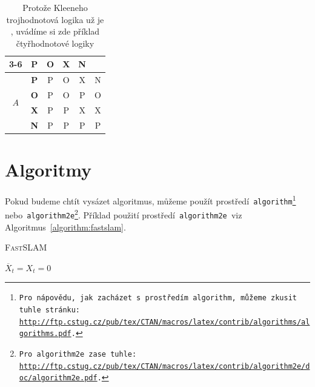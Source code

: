 \documentclass[a4paper, 11pt]{article}
\begin{document}
\begin{table}[h]
\begin{center}
\begin{tabular}{| c | c | c | c | c | c |}
            \\ \cline{3-6}
            \multicolumn{2}{| c |}{} & \textbf{P}   & \textbf{O} & \textbf{X}	& \textbf{N} \\ \hline
			\multirow{4}{*}{$A$}	& \textbf{P}    & P & O & X & N \\ \cline{2-6}
									& \textbf{O}    & P & O & P & O \\ \cline{2-6}
									& \textbf{X}    & P & P & X & X \\ \cline{2-6}
									& \textbf{N}    & P & P & P & P \\ \hline
		\end{tabular}
        \caption{Protože Kleeneho trojhodnotová logika už je , uvádíme si zde příklad čtyřhodnotové
        logiky}
        \label{table:logika}        
    \end{center}
\end{table}
\pagebreak

\section{Algoritmy}
\label{section:algoritmy}
Pokud budeme chtít vysázet algoritmus, můžeme použít prostředí\texttt{ algorithm\footnote{Pro nápovědu, jak zacházet s~prostředím\texttt{ algorithm,} můžeme zkusit tuhle stránku:\\
    \href{http://ftp.cstug.cz/pub/tex/CTAN/macros/latex/contrib/algorithms/algorithms.pdf}{http://ftp.cstug.cz/pub/tex/CTAN/macros/latex/contrib/algorithms/algorithms.pdf}.
} }
nebo\texttt{ algorithm2e\footnote{
    Pro\texttt{ algorithm2e }zase tuhle:
    \href{http://ftp.cstug.cz/pub/tex/CTAN/macros/latex/contrib/algorithm2e/doc/algorithm2e.pdf}{http://ftp.cstug.cz/pub/tex/CTAN/macros/latex/contrib/algorithm2e/doc/algorithm2e.pdf}.
}}. Příklad použití prostředí\texttt{ algorithm2e }viz Algoritmus~\ref{algorithm:fastslam}.\\
\begin{algorithm}
    \caption{\textsc{FastSLAM}}
    \label{algorithm:fastslam}
    \SetNlSty{}{}{:}
    \SetNlSkip{-1em}
    \Indp\Indpp

    $\overline{X}_t = X_t = 0$ \\
\end{algorithm}
\end{document}

